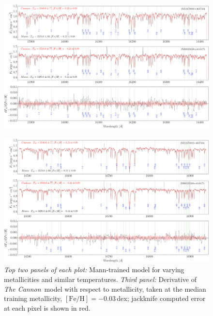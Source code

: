 \documentclass[twocolumn]{aastex62}
\newcommand{\thecannon}{\textsl{The Cannon}}
\newcommand{\feh}{[{\mathrm{Fe}/\mathrm{H}}]}
\begin{document}
\begin{figure}[]
	\begin{center}
	\includegraphics[width=16cm]{demo_derivatives_feh2.png}
	\end{center}
\end{figure}

\begin{figure}[]
	\begin{center}
	\includegraphics[width=16cm]{demo_derivatives_feh3.png}
	\end{center}
	\caption{\textit{Top two panels of each plot:} Mann-trained model for varying metallicities and similar temperatures. \textit{Third panel:} Derivative of \thecannon\ model with respect to metallicity, taken at the median training metallicity, $\feh=-0.03$\,dex; jackknife computed error at each pixel is shown in red.} \label{fig:demo_feh}
\end{figure}
\end{document}
